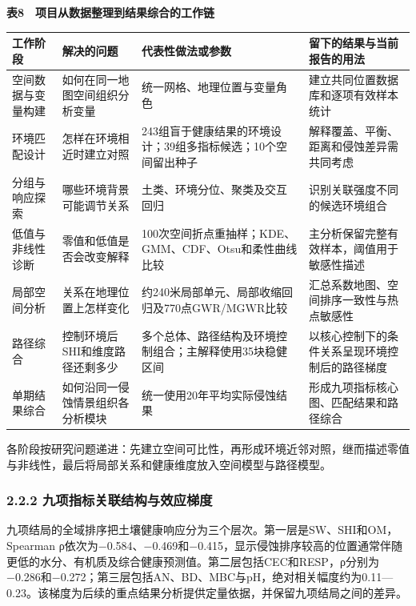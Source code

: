 \documentclass[
  11pt,
  a4paper,
]{ctexart}
\begin{document}
\textbf{表8　项目从数据整理到结果综合的工作链}

\begin{longtable}[]{@{}
  >{\raggedright\arraybackslash}p{}
  >{\raggedright\arraybackslash}p{}
  >{\raggedright\arraybackslash}p{}
  >{\raggedright\arraybackslash}p{}@{}}
\toprule
工作阶段 & 解决的问题 & 代表性做法或参数 & 留下的结果与当前报告的用法 \\
\midrule
\endhead
空间数据与变量构建 & 如何在同一地图空间组织分析变量 &
统一网格、地理位置与变量角色 & 建立共同位置数据库和逐项有效样本统计 \\
环境匹配设计 & 怎样在环境相近时建立对照 &
243组盲于健康结果的环境设计；39组多指标候选；10个空间留出种子 &
解释覆盖、平衡、距离和侵蚀差异需共同考虑 \\
分组与响应探索 & 哪些环境背景可能调节关系 &
土类、环境分位、聚类及交互回归 & 识别关联强度不同的候选环境组合 \\
低值与非线性诊断 & 零值和低值是否会改变解释 &
100次空间折点重抽样；KDE、GMM、CDF、Otsu和柔性曲线比较 &
主分析保留完整有效样本，阈值用于敏感性描述 \\
局部空间分析 & 关系在地理位置上怎样变化 &
约240米局部单元、局部收缩回归及770点GWR/MGWR比较 &
汇总系数地图、空间排序一致性与热点敏感性 \\
路径综合 & 控制环境后SHI和维度路径还剩多少 &
多个总体、路径结构及环境控制组合；主解释使用35块稳健区间 &
以核心控制下的条件关系呈现环境控制后的路径梯度 \\
单期结果综合 & 如何沿同一侵蚀情景组织各分析模块 &
统一使用20年平均实际侵蚀结果 & 形成九项指标核心图、匹配结果和路径综合 \\
\bottomrule
\end{longtable}

各阶段按研究问题递进：先建立空间可比性，再形成环境近邻对照，继而描述零值与非线性，最后将局部关系和健康维度放入空间模型与路径模型。

\hypertarget{ux4e5dux9879ux6307ux6807ux5173ux8054ux7ed3ux6784ux4e0eux6548ux5e94ux68afux5ea6}{%
\subsubsection{2.2.2
九项指标关联结构与效应梯度}\label{ux4e5dux9879ux6307ux6807ux5173ux8054ux7ed3ux6784ux4e0eux6548ux5e94ux68afux5ea6}}

九项结局的全域排序把土壤健康响应分为三个层次。第一层是SW、SHI和OM，Spearman
ρ依次为−0.584、−0.469和−0.415，显示侵蚀排序较高的位置通常伴随更低的水分、有机质及综合健康预测值。第二层包括CEC和RESP，ρ分别为−0.286和−0.272；第三层包括AN、BD、MBC与pH，绝对相关幅度约为0.11---0.23。该梯度为后续的重点结果分析提供定量依据，并保留九项结局之间的差异。
\end{document}
